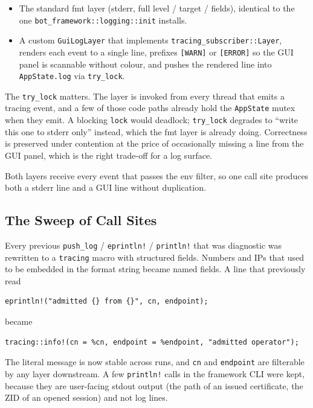\documentclass[11pt,a4paper]{article}
\begin{document}
\begin{itemize}
  \item The standard fmt layer (stderr, full level / target /
        fields), identical to the one
        \texttt{bot\_framework::logging::init} installs.
  \item A custom \texttt{GuiLogLayer} that implements
        \texttt{tracing\_subscriber::Layer}, renders each event to
        a single line, prefixes \texttt{[WARN]} or \texttt{[ERROR]}
        so the GUI panel is scannable without colour, and pushes
        the rendered line into \texttt{AppState.log} via
        \texttt{try\_lock}.
\end{itemize}

The \texttt{try\_lock} matters. The layer is invoked from every
thread that emits a tracing event, and a few of those code paths
already hold the \texttt{AppState} mutex when they emit. A
blocking \texttt{lock} would deadlock; \texttt{try\_lock}
degrades to ``write this one to stderr only'' instead, which the
fmt layer is already doing. Correctness is preserved under
contention at the price of occasionally missing a line from the
GUI panel, which is the right trade-off for a log surface.

Both layers receive every event that passes the env filter, so
one call site produces both a stderr line and a GUI line without
duplication.

\subsection{The Sweep of Call Sites}

Every previous \texttt{push\_log} / \texttt{eprintln!} /
\texttt{println!} that was diagnostic was rewritten to a
\texttt{tracing} macro with structured fields. Numbers and IPs
that used to be embedded in the format string became named
fields. A line that previously read

\begin{lstlisting}
eprintln!("admitted {} from {}", cn, endpoint);
\end{lstlisting}

\noindent became

\begin{lstlisting}
tracing::info!(cn = %cn, endpoint = %endpoint, "admitted operator");
\end{lstlisting}

\noindent The literal message is now stable across runs, and
\texttt{cn} and \texttt{endpoint} are filterable by any layer
downstream. A few \texttt{println!} calls in the framework CLI
were kept, because they are user-facing stdout output (the path
of an issued certificate, the ZID of an opened session) and not
log lines.
\end{document}
